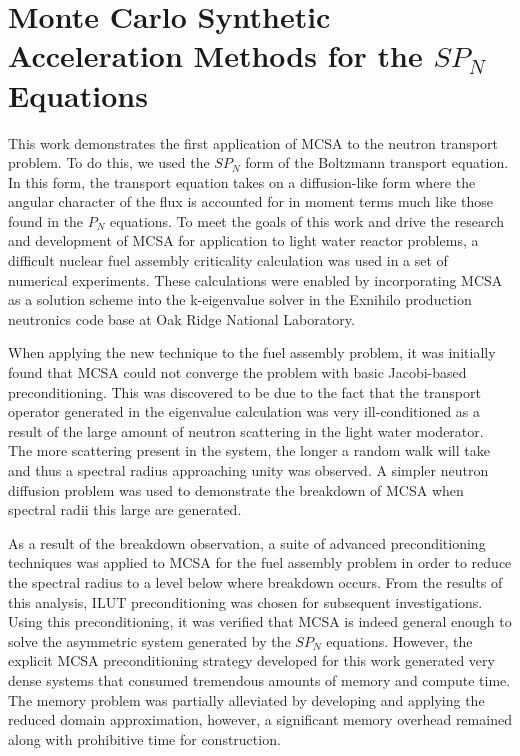 \section{Monte Carlo Synthetic Acceleration Methods for the $SP_N$ Equations\ }
\label{sec:spn_conclusion}
This work demonstrates the first application of MCSA to the neutron
transport problem. To do this, we used the $SP_N$ form of the
Boltzmann transport equation. In this form, the transport equation
takes on a diffusion-like form where the angular character of the flux
is accounted for in moment terms much like those found in the $P_N$
equations. To meet the goals of this work and drive the research and
development of MCSA for application to light water reactor problems, a
difficult nuclear fuel assembly criticality calculation was used in a
set of numerical experiments. These calculations were enabled by
incorporating MCSA as a solution scheme into the k-eigenvalue solver
in the Exnihilo production neutronics code base at Oak Ridge National
Laboratory.

When applying the new technique to the fuel assembly problem, it was
initially found that MCSA could not converge the problem with basic
Jacobi-based preconditioning. This was discovered to be due to the
fact that the transport operator generated in the eigenvalue
calculation was very ill-conditioned as a result of the large amount
of neutron scattering in the light water moderator. The more
scattering present in the system, the longer a random walk will take
and thus a spectral radius approaching unity was observed. A simpler
neutron diffusion problem was used to demonstrate the breakdown of
MCSA when spectral radii this large are generated.

As a result of the breakdown observation, a suite of advanced
preconditioning techniques was applied to MCSA for the fuel assembly
problem in order to reduce the spectral radius to a level below where
breakdown occurs. From the results of this analysis, ILUT
preconditioning was chosen for subsequent investigations. Using this
preconditioning, it was verified that MCSA is indeed general enough to
solve the asymmetric system generated by the $SP_N$
equations. However, the explicit MCSA preconditioning strategy
developed for this work generated very dense systems that consumed
tremendous amounts of memory and compute time. The memory problem was
partially alleviated by developing and applying the reduced domain
approximation, however, a significant memory overhead remained along
with prohibitive time for construction.

